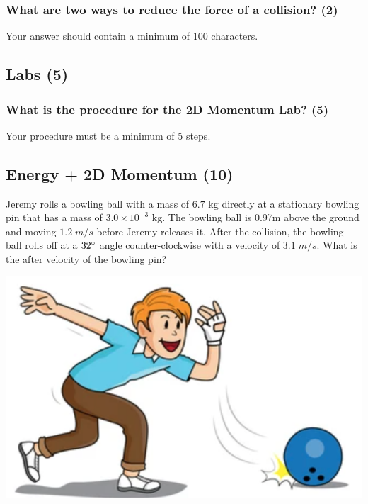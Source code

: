 \documentclass{article}
\begin{document}
\subsubsection{What are two ways to reduce the force of a collision? (2)}
Your answer should contain a minimum of 100 characters.

\subsection{Labs (5)}
\subsubsection{What is the procedure for the 2D Momentum Lab? (5)}
Your procedure must be a minimum of 5 steps.

\subsection{Energy + 2D Momentum (10)}

\vspace{5pt}

\begin{minipage}{0.6\textwidth}
    Jeremy rolls a bowling ball with a mass of $6.7$ kg directly at a stationary
    bowling pin that has a mass of $3.0\times 10^{-3}$ kg. The bowling ball is 0.97m above the ground and moving
    $1.2\;m/s$ before Jeremy releases it. After the collision, the bowling ball rolls off at a $32\degree$ angle
    counter-clockwise with a velocity of $3.1\;m/s$. What is the after velocity of the bowling pin?
\end{minipage}
\hspace{5pt}
\begin{minipage}{0.3\textwidth}
    \includegraphics[scale=0.5]{images/bowling.png}
\end{minipage}\leavevmode\\
\end{document}
